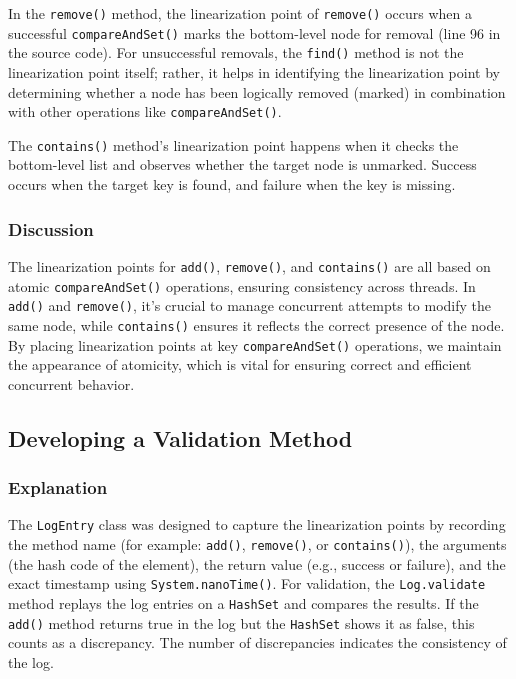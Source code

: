 \documentclass{article}
\begin{document}
In the \texttt{remove()} method, the linearization point of \texttt{remove()} occurs when a successful \texttt{compareAndSet()} marks the bottom-level node for removal (line 96 in the source code). For unsuccessful removals, the \texttt{find()} method is not the linearization point itself; rather, it helps in identifying the linearization point by determining whether a node has been logically removed (marked) in combination with other operations like \texttt{compareAndSet()}.

The \texttt{contains()} method’s linearization point happens when it checks the bottom-level list and observes whether the target node is unmarked. Success occurs when the target key is found, and failure when the key is missing.


\subsubsection{Discussion}
The linearization points for \texttt{add()}, \texttt{remove()}, and \texttt{contains()} are all based on atomic \texttt{compareAndSet()} operations, ensuring consistency across threads. In \texttt{add()} and \texttt{remove()}, it’s crucial to manage concurrent attempts to modify the same node, while \texttt{contains()} ensures it reflects the correct presence of the node. By placing linearization points at key \texttt{compareAndSet()} operations, we maintain the appearance of atomicity, which is vital for ensuring correct and efficient concurrent behavior.



\newpage
\subsection{Developing a Validation Method}

\subsubsection{Explanation}
The \texttt{LogEntry} class was designed to capture the linearization points by recording the method name (for example: \texttt{add()}, \texttt{remove()}, or \texttt{contains()}), the arguments (the hash code of the element), the return value (e.g., success or failure), and the exact timestamp using \texttt{System.nanoTime()}. For validation, the \texttt{Log.validate} method replays the log entries on a \texttt{HashSet} and compares the results. If the \texttt{add()} method returns true in the log but the \texttt{HashSet} shows it as false, this counts as a discrepancy. The number of discrepancies indicates the consistency of the log.
\end{document}
